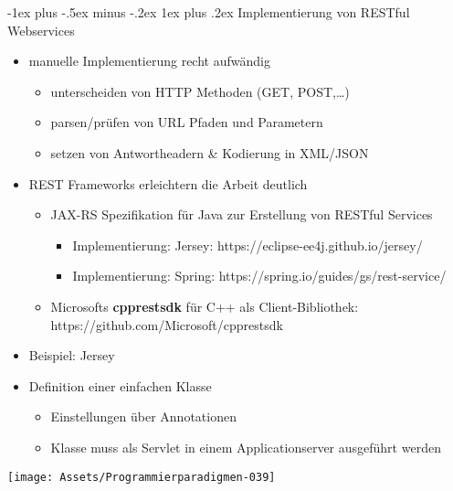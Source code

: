 \documentclass[10pt]{article}
\makeatletter
\renewcommand{\subsubsection}{\@startsection{subsubsection}{3}{0mm}%
                                {-1ex plus -.5ex minus -.2ex}%
                                {1ex plus .2ex}%
                                {\normalfont\small\bfseries}}
\makeatother
\begin{document}
\subsubsection{Implementierung von RESTful Webservices}
\begin{itemize}
  \item manuelle Implementierung recht aufwändig
        \begin{itemize}
          \item unterscheiden von HTTP Methoden (GET, POST,…)
          \item parsen/prüfen von URL Pfaden und Parametern
          \item setzen von Antwortheadern \& Kodierung in XML/JSON
        \end{itemize}
  \item REST Frameworks erleichtern die Arbeit deutlich
        \begin{itemize}
          \item JAX-RS Spezifikation für Java zur Erstellung von RESTful Services
                \begin{itemize}
                  \item Implementierung: Jersey: https://eclipse-ee4j.github.io/jersey/
                  \item Implementierung: Spring:
                        https://spring.io/guides/gs/rest-service/
                \end{itemize}
          \item Microsofts \textbf{cpprestsdk} für C++ als Client-Bibliothek:
                https://github.com/Microsoft/cpprestsdk
        \end{itemize}
\end{itemize}
\begin{itemize}
  \item Beispiel: Jersey
  \item Definition einer einfachen Klasse
        \begin{itemize}
          \item Einstellungen über Annotationen
          \item Klasse muss als Servlet in einem Applicationserver ausgeführt werden
        \end{itemize}
\end{itemize}
\begin{center}
  \centering
  \texttt{[image: Assets/Programmierparadigmen-039]}
\end{center}
\end{document}
